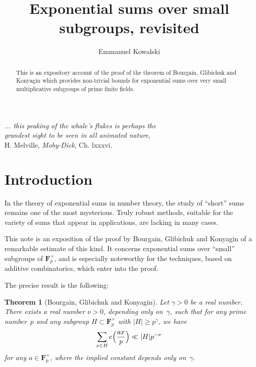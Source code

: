 \documentclass[12pt]{amsart}
\renewcommand{\geq}{\geqslant}
\numberwithin{equation}{section}
\newcommand{\Ff}{\mathbf{F}}
\theoremstyle{plain}
\newtheorem{theorem}{Theorem}[section]
\theoremstyle{remark}
\theoremstyle{definition}
\renewcommand{\geq}{\geqslant}
\begin{document}
\title{Exponential sums over small subgroups, revisited}


\author{Emmanuel Kowalski}
\address[E. Kowalski]{D-MATH, ETH Z\"urich, R\"amistrasse 101, 8092 Z\"urich, Switzerland} 



\begin{abstract}
  This is an expository account of the proof of the theorem of Bourgain,
  Glibichuk and Konyagin which provides non-trivial bounds for
  exponential sums over very small multiplicative subgroups of prime
  finite fields.
\end{abstract}


\maketitle

\begin{flushright}
  \textit{... this peaking of the whale's flukes is perhaps
    the \\
    grandest sight to
    be seen in all animated nature},\\
  H. Melville, \textit{Moby-Dick}, Ch. lxxxvi.
\end{flushright}

\bigskip
\bigskip


\section{Introduction}

In the theory of exponential sums in number theory, the study of
``short'' sums remains one of the most mysterious. Truly robust methods,
suitable for the variety of sums that appear in applications, are
lacking in many cases. 

This note is an exposition of the proof by Bourgain, Glibichuk and
Konyagin of a remarkable estimate of this kind. It concerns exponential
sums over ``small'' subgroups of $\Ff_p^{\times}$, and is especially
noteworthy for the techniques, based on additive combinatorics, which
enter into the proof.

The precise result is the following:

\begin{theorem}[Bourgain, Glibichuk and Konyagin]\label{th-bgk}
  Let $\gamma>0$ be a real number. There exists a real number $\nu>0$,
  depending only on~$\gamma$, such that for any prime number~$p$ and
  any subgroup $H\subset \Ff_p^{\times}$ with $|H|\geq p^{\gamma}$, we
  have
  $$
  \sum_{x\in H}e\Bigl(\frac{ax}{p}\Bigr)\ll |H|p^{-\nu}
  $$
  for any $a\in\Ff_p^{\times}$, where the implied constant depends only
  on~$\gamma$. 
\end{theorem}
\end{document}
